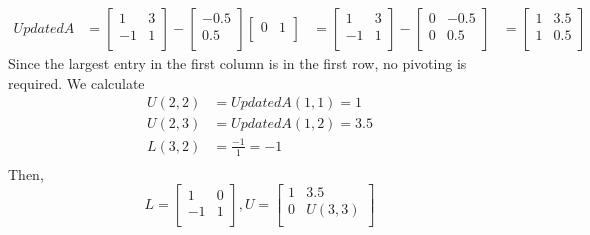 \documentclass{article}
\DeclareMathOperator{\1}{\mathit{1}}
\numberwithin{figure}{section} %
\begin{document}
    \[
        \begin{aligned}
            UpdatedA &= 
                \begin{bmatrix}
                    1 & 3 \\
                    -1 & 1 \\
                \end{bmatrix} -
                \begin{bmatrix}
                    -0.5 \\
                    0.5 \\
                \end{bmatrix}
                \begin{bmatrix}
                    0 & 1 \\
                \end{bmatrix}
            &=
                \begin{bmatrix}
                    1 & 3 \\
                    -1 & 1 \\
                \end{bmatrix} -
                \begin{bmatrix}
                    0 & -0.5 \\
                    0 & 0.5 \\
                \end{bmatrix} 
            &=
                \begin{bmatrix}
                    1 & 3.5 \\
                    1 & 0.5 \\
                \end{bmatrix} 
        \end{aligned}
    \]
Since the largest entry in the first column is in the first row, no pivoting is required. We calculate
    \begin{align*}
        U(2,2) &= UpdatedA(1,1) = 1 \\
        U(2,3) &= UpdatedA(1,2) = 3.5 \\
        L(3,2) &= \frac{-1}{1} = -1 \\
    \end{align*}
Then,
    \[
        L = 
        \begin{bmatrix}
            1 & 0 \\
            -1 & 1 \\
        \end{bmatrix} ,
        U =
        \begin{bmatrix}
            1 & 3.5 \\
            0 & U(3,3) \\
        \end{bmatrix} 
    \]
\end{document}
